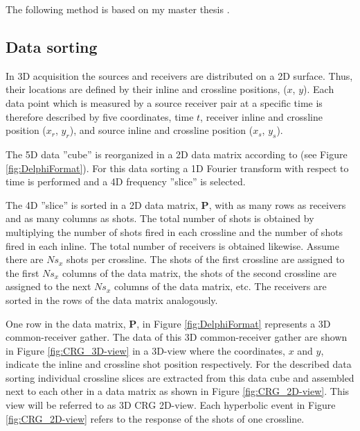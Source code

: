 \documentclass{madrid15WS}
\begin{document}
The following method is based on my master thesis \citep{myself}.

\subsection{Data sorting}

In 3D acquisition the sources and receivers are distributed on a 2D surface. Thus, their locations are defined by their inline and crossline positions, ($x$, $y$). Each data point which is measured by a source receiver pair at a specific time is therefore described by five coordinates, time $t$, receiver inline and crossline position ($x_r$, $y_r$), and source inline and crossline position ($x_s$, $y_s$).

The 5D data ”cube” is reorganized in a 2D data matrix according to \citet{Delphi-Format} (see Figure \ref{fig:DelphiFormat}). For this data sorting a 1D Fourier transform with respect to time is performed and a 4D frequency ”slice” is selected.

The 4D ”slice” is sorted in a 2D data matrix, $\mathbf{P}$, with as many rows as receivers and as many columns as shots. The total number of shots is obtained by multiplying the number of shots fired in each crossline and the number of shots fired in each inline. The total number of receivers is obtained likewise. Assume there are $Ns_x$ shots per crossline. The shots of the first crossline are assigned to the first $Ns_x$ columns of the data matrix, the shots of the second crossline are assigned to the next $Ns_x$ columns of the data matrix, etc. The receivers are sorted in the rows of the data matrix analogously.

One row in the data matrix, $\mathbf{P}$, in Figure \ref{fig:DelphiFormat} represents a 3D common-receiver gather. The data of this 3D common-receiver gather are shown in Figure \ref{fig:CRG_3D-view} in a 3D-view where the coordinates, $x$ and $y$, indicate the inline and crossline shot position respectively. For the described data sorting individual crossline slices are extracted from this data cube and assembled next to each other in a data matrix as shown in Figure \ref{fig:CRG_2D-view}. This view will be referred to as 3D CRG 2D-view. Each hyperbolic event in Figure \ref{fig:CRG_2D-view} refers to the response of the shots of one crossline.
\end{document}

